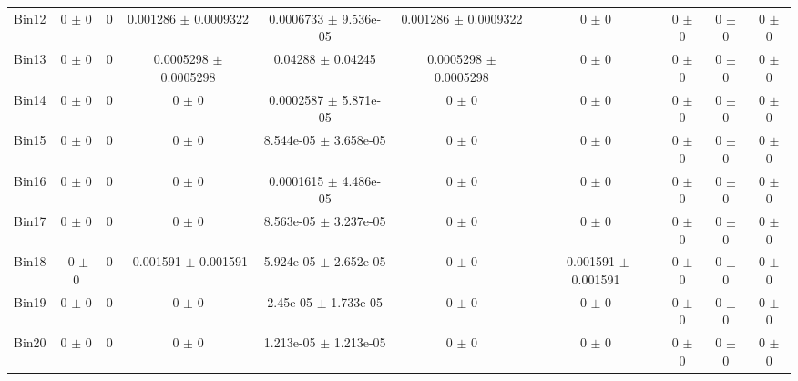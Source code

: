\begin{tabular}{@{\extracolsep{4pt}}lccccccccc@{}}
     Bin12 & 0 $\pm$ 0 & 0 & 0.001286 $\pm$ 0.0009322 & 0.0006733 $\pm$ 9.536e-05 & 0.001286 $\pm$ 0.0009322 & 0 $\pm$ 0 & 0 $\pm$ 0 & 0 $\pm$ 0 & 0 $\pm$ 0 \\ 
     Bin13 & 0 $\pm$ 0 & 0 & 0.0005298 $\pm$ 0.0005298 & 0.04288 $\pm$ 0.04245 & 0.0005298 $\pm$ 0.0005298 & 0 $\pm$ 0 & 0 $\pm$ 0 & 0 $\pm$ 0 & 0 $\pm$ 0 \\ 
     Bin14 & 0 $\pm$ 0 & 0 & 0 $\pm$ 0 & 0.0002587 $\pm$ 5.871e-05 & 0 $\pm$ 0 & 0 $\pm$ 0 & 0 $\pm$ 0 & 0 $\pm$ 0 & 0 $\pm$ 0 \\ 
     Bin15 & 0 $\pm$ 0 & 0 & 0 $\pm$ 0 & 8.544e-05 $\pm$ 3.658e-05 & 0 $\pm$ 0 & 0 $\pm$ 0 & 0 $\pm$ 0 & 0 $\pm$ 0 & 0 $\pm$ 0 \\ 
     Bin16 & 0 $\pm$ 0 & 0 & 0 $\pm$ 0 & 0.0001615 $\pm$ 4.486e-05 & 0 $\pm$ 0 & 0 $\pm$ 0 & 0 $\pm$ 0 & 0 $\pm$ 0 & 0 $\pm$ 0 \\ 
     Bin17 & 0 $\pm$ 0 & 0 & 0 $\pm$ 0 & 8.563e-05 $\pm$ 3.237e-05 & 0 $\pm$ 0 & 0 $\pm$ 0 & 0 $\pm$ 0 & 0 $\pm$ 0 & 0 $\pm$ 0 \\ 
     Bin18 & -0 $\pm$ 0 & 0 & -0.001591 $\pm$ 0.001591 & 5.924e-05 $\pm$ 2.652e-05 & 0 $\pm$ 0 & -0.001591 $\pm$ 0.001591 & 0 $\pm$ 0 & 0 $\pm$ 0 & 0 $\pm$ 0 \\ 
     Bin19 & 0 $\pm$ 0 & 0 & 0 $\pm$ 0 & 2.45e-05 $\pm$ 1.733e-05 & 0 $\pm$ 0 & 0 $\pm$ 0 & 0 $\pm$ 0 & 0 $\pm$ 0 & 0 $\pm$ 0 \\ 
     Bin20 & 0 $\pm$ 0 & 0 & 0 $\pm$ 0 & 1.213e-05 $\pm$ 1.213e-05 & 0 $\pm$ 0 & 0 $\pm$ 0 & 0 $\pm$ 0 & 0 $\pm$ 0 & 0 $\pm$ 0 \\ 
\hline\hline
  \end{tabular}
